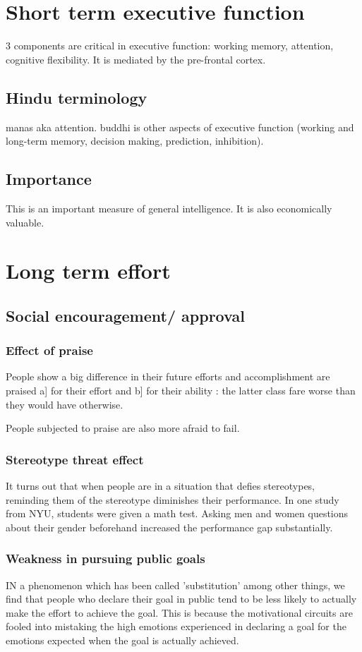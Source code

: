 \documentclass[oneside, article]{memoir}
\begin{document}
\section{Short term executive function}
3 components are critical in executive function: working memory, attention, cognitive flexibility. It is mediated by the pre-frontal cortex.

\subsection{Hindu terminology}
manas aka attention. buddhi is other aspects of executive function (working and long-term memory, decision making, prediction, inhibition).

\subsection{Importance}
This is an important measure of general intelligence. It is also economically valuable.

\section{Long term effort}
\subsection{Social encouragement/ approval}
\subsubsection{Effect of praise}
People show a big difference in their future efforts and accomplishment are praised a] for their effort and b] for their ability : the latter class fare worse than they would have otherwise. 

People subjected to praise are also more afraid to fail.

\subsubsection{Stereotype threat effect}
It turns out that when people are in a situation that defies stereotypes, reminding them of the stereotype diminishes their performance. In one study from NYU, students were given a math test. Asking men and women questions about their gender beforehand increased the performance gap substantially.

\subsubsection{Weakness in pursuing public goals}
IN a phenomenon which has been called 'substitution' among other things, we find that people who declare their goal in public tend to be less likely to actually make the effort to achieve the goal. This is because the motivational circuits are fooled into mistaking the high emotions experienced in declaring a goal for the emotions expected when the goal is actually achieved.
\end{document}

